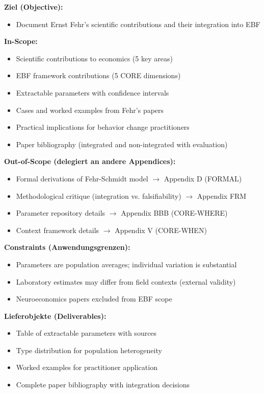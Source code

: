 \begin{tcolorbox}[
    colback=orange!5!white,
    colframe=orange!75!black,
    title={\textbf{Appendix Scope: Ziel / In-Scope / Out-of-Scope / Constraints}},
    fonttitle=\bfseries
]

\textbf{Ziel (Objective):}
\begin{itemize}[nosep]
    \item Document Ernst Fehr's scientific contributions and their integration into EBF
\end{itemize}

\textbf{In-Scope:}
\begin{itemize}[nosep]
    \item Scientific contributions to economics (5 key areas)
    \item EBF framework contributions (5 CORE dimensions)
    \item Extractable parameters with confidence intervals
    \item Cases and worked examples from Fehr's papers
    \item Practical implications for behavior change practitioners
    \item Paper bibliography (integrated and non-integrated with evaluation)
\end{itemize}

\textbf{Out-of-Scope (delegiert an andere Appendices):}
\begin{itemize}[nosep]
    \item Formal derivations of Fehr-Schmidt model $\rightarrow$ Appendix D (FORMAL)
    \item Methodological critique (integration vs. falsifiability) $\rightarrow$ Appendix FRM
    \item Parameter repository details $\rightarrow$ Appendix BBB (CORE-WHERE)
    \item Context framework details $\rightarrow$ Appendix V (CORE-WHEN)
\end{itemize}

\textbf{Constraints (Anwendungsgrenzen):}
\begin{itemize}[nosep]
    \item Parameters are population averages; individual variation is substantial
    \item Laboratory estimates may differ from field contexts (external validity)
    \item Neuroeconomics papers excluded from EBF scope
\end{itemize}

\textbf{Lieferobjekte (Deliverables):}
\begin{itemize}[nosep]
    \item Table of extractable parameters with sources
    \item Type distribution for population heterogeneity
    \item Worked examples for practitioner application
    \item Complete paper bibliography with integration decisions
\end{itemize}

\end{tcolorbox}



